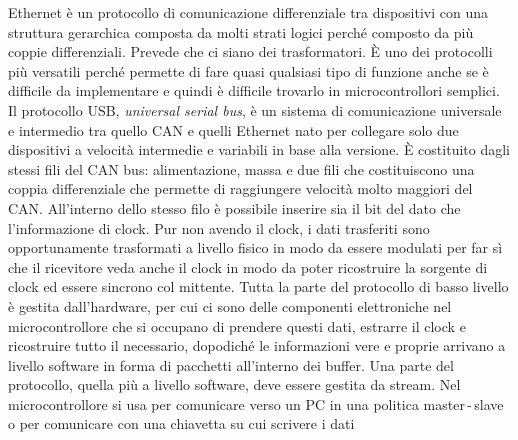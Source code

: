 \documentclass[12pt, a4paper]{report}
\begin{document}
\begin{description}
    Ethernet è un protocollo di comunicazione differenziale tra dispositivi con una struttura gerarchica composta da molti strati logici perché composto da più coppie differenziali. Prevede che ci siano dei trasformatori. È uno dei protocolli più versatili perché permette di fare quasi qualsiasi tipo di funzione anche se è difficile da implementare e quindi è difficile trovarlo in microcontrollori semplici. Il protocollo USB, \textit{universal serial bus}, è un sistema di comunicazione universale e intermedio tra quello CAN e quelli Ethernet nato per collegare solo due dispositivi a velocità intermedie e variabili in base alla versione. È costituito dagli stessi fili del CAN bus: alimentazione, massa e due fili che costituiscono una coppia differenziale che permette di raggiungere velocità molto maggiori del CAN. All'interno dello stesso filo è possibile inserire sia il bit del dato che l'informazione di clock. Pur non avendo il clock, i dati trasferiti sono opportunamente trasformati a livello fisico in modo da essere modulati per far sì che il ricevitore veda anche il clock in modo da poter ricostruire la sorgente di clock ed essere sincrono col mittente. Tutta la parte del protocollo di basso livello è gestita dall'hardware, per cui ci sono delle componenti elettroniche nel microcontrollore che si occupano di prendere questi dati, estrarre il clock e ricostruire tutto il necessario, dopodiché le informazioni vere e proprie arrivano a livello software in forma di pacchetti all'interno dei buffer. Una parte del protocollo, quella più a livello software, deve essere gestita da stream. Nel microcontrollore si usa per comunicare verso un PC in una politica master\,-\,slave o per comunicare con una chiavetta su cui scrivere i dati
\end{description}
\end{document}
